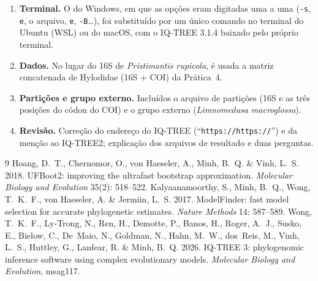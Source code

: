 \documentclass[11pt,a4paper]{article}
\newcommand{\arq}[1]{\path{#1}}
\begin{document}
\begin{enumerate}
\item \textbf{Terminal.} O \arq{iqtree3-click.exe} do Windows, em que as opções eram digitadas
uma a uma (\verb|-s|, \verb|e|, o arquivo, \verb|e|, \verb|-B|\ldots), foi substituído por um
único comando no terminal do Ubuntu (WSL) ou do macOS, com o IQ-TREE 3.1.4 baixado pelo
próprio terminal.
\item \textbf{Dados.} No lugar do 16S de \emph{Pristimantis rupicola}, é usada a matriz
concatenada de Hylodidae (16S + COI) da Prática~4.
\item \textbf{Partições e grupo externo.} Incluídos o arquivo de partições (16S e as três
posições do códon do COI) e o grupo externo (\emph{Limnomedusa macroglossa}).
\item \textbf{Revisão.} Correção do endereço do IQ-TREE (``\texttt{https://https://}'') e da
menção ao IQ-TREE2; explicação dos arquivos de resultado e duas perguntas.
\end{enumerate}

\begin{thebibliography}{9}
 Hoang, D.~T., Chernomor, O., von Haeseler, A., Minh, B.~Q. \& Vinh,
L.~S. 2018. UFBoot2: improving the ultrafast bootstrap approximation. \emph{Molecular Biology
and Evolution} 35(2): 518--522.
 Kalyaanamoorthy, S., Minh, B.~Q., Wong, T.~K.~F., von Haeseler,
A. \& Jermiin, L.~S. 2017. ModelFinder: fast model selection for accurate phylogenetic
estimates. \emph{Nature Methods} 14: 587--589.
 Wong, T.~K.~F., Ly-Trong, N., Ren, H., Demotte, P., Banos, H., Roger,
A.~J., Susko, E., Bielow, C., De~Maio, N., Goldman, N., Hahn, M.~W., dos~Reis, M., Vinh,
L.~S., Huttley, G., Lanfear, R. \& Minh, B.~Q. 2026. IQ-TREE 3: phylogenomic inference
software using complex evolutionary models. \emph{Molecular Biology and Evolution}, msag117.
\end{thebibliography}
\end{document}
